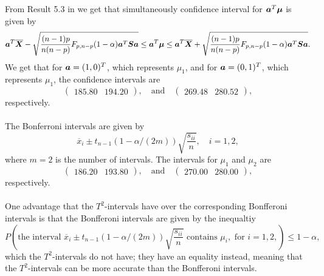 From Result 5.3 in \cite[p. 225]{book} we get that simultaneously
confidence interval for $\bm{a}^{T} \bm{\mu}$ is  given by
\begin{equation*}
  \bm{a}^{T} \overline{\bm{X}} - \sqrt{\frac{(n-1)p}{n(n-p)}F_{p,
  n-p}(1 -\alpha) \bm{a}^{T}\bm{S}\bm{a}} \leq \bm{a}^{T} \bm{\mu} \leq 
\bm{a}^{T} \overline{\bm{X}} + \sqrt{\frac{(n-1)p}{n(n-p)}F_{p,
  n-p}(1 -\alpha) \bm{a}^{T}\bm{S}\bm{a}} .
\end{equation*}
We get that for $\bm{a} = (1, 0)^{T}$, which represents $\mu_{1}$, and for
$\bm{a} = (0,1)^{T}$, which represents $\mu_{1}$, the confidence
intervals are
\begin{equation*}
  \begin{pmatrix}
    185.80 &194.20 
  \end{pmatrix},\quad \text{and} \quad
  \begin{pmatrix}
    269.48 &280.52  
  \end{pmatrix},
\end{equation*}
respectively.\\
\\
The Bonferroni intervals are given by 
\begin{equation*}
  \overline{x}_{i} \pm t_{n-1}(1 - \alpha/(2m) )\sqrt{\frac{s_{ii}}{n}},
\quad i = 1,2,
\end{equation*}
where $m= 2$ is the number of intervals. The intervals for
$\mu_{1}$ and $\mu_{2}$ are
\begin{equation*}
  \begin{pmatrix}
    186.20 &193.80 
  \end{pmatrix}, \quad \text{and}\quad
  \begin{pmatrix}
    270.00 &280.00 
  \end{pmatrix},
\end{equation*}
respectively.\\
\\
One advantage that the $T^{2}$-intervals have over the corresponding
Bonfferoni intervals is that the
Bonfferoni intervals are given by the inequaltiy
\begin{equation*}
  P\left(\text{the interval }\overline{x}_{i} \pm t_{n-1}(1 - \alpha/(2m)
  )\sqrt{\frac{s_{ii}}{n}}\text{ contains }\mu_{i},
 \text{ for }i = 1,2,\right) \leq 1 - \alpha,
\end{equation*}
which the $T^{2}$-intervals do  not have; they have an equality
instead, meaning that the $T^{2}$-intervals can be more accurate than
the Bonfferoni intervals. 
